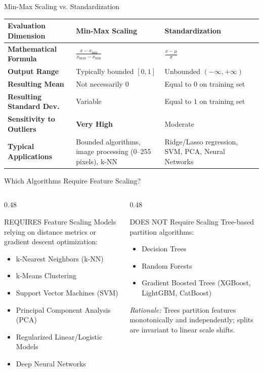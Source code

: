 \documentclass[aspectratio=169,11pt]{beamer}
\newcommand{\smallgap}{\vspace{0.35em}}
\begin{document}
\begin{frame}{Min-Max Scaling vs. Standardization}
\small
\begin{tabularx}{\textwidth}{lXX}
\toprule
\textbf{Evaluation Dimension} & \textbf{Min-Max Scaling} & \textbf{Standardization} \\
\midrule
\textbf{Mathematical Formula} & $\frac{x - x_{\min}}{x_{\max} - x_{\min}}$ & $\frac{x - \mu}{\sigma}$ \\
\textbf{Output Range} & Typically bounded $[0, 1]$ & Unbounded $(-\infty, +\infty)$ \\
\textbf{Resulting Mean} & Not necessarily $0$ & Equal to $0$ on training set \\
\textbf{Resulting Standard Dev.} & Variable & Equal to $1$ on training set \\
\textbf{Sensitivity to Outliers} & \textbf{Very High} & Moderate \\
\textbf{Typical Applications} & Bounded algorithms, image processing (0--255 pixels), k-NN & Ridge/Lasso regression, SVM, PCA, Neural Networks \\
\bottomrule
\end{tabularx}
\end{frame}

\begin{frame}{Which Algorithms Require Feature Scaling?}
\begin{columns}[T]
\begin{column}{0.48\textwidth}
\begin{block}{REQUIRES Feature Scaling}
Models relying on distance metrics or gradient descent optimization:
\begin{itemize}
  \item k-Nearest Neighbors (k-NN)
  \item k-Means Clustering
  \item Support Vector Machines (SVM)
  \item Principal Component Analysis (PCA)
  \item Regularized Linear/Logistic Models
  \item Deep Neural Networks
\end{itemize}
\end{block}
\end{column}
\begin{column}{0.48\textwidth}
\begin{block}{DOES NOT Require Scaling}
Tree-based partition algorithms:
\begin{itemize}
  \item Decision Trees
  \item Random Forests
  \item Gradient Boosted Trees (XGBoost, LightGBM, CatBoost)
\end{itemize}
\smallgap
\textit{Rationale:} Trees partition features monotonically and independently; splits are invariant to linear scale shifts.
\end{block}
\end{column}
\end{columns}
\end{frame}
\end{document}
